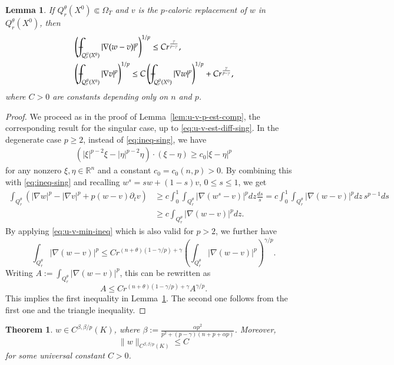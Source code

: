 \documentclass[11pt,oneside,english]{amsart}
\newcommand{\R}{{\mathbb R}}
\newcommand{\al}{\alpha}
\newcommand{\be}{\beta}
\newcommand{\D}{\nabla}
\numberwithin{equation}{section}
\def\Xint#1{\mathchoice
  {\XXint\displaystyle\textstyle{#1}}%
  {\XXint\textstyle\scriptstyle{#1}}%
  {\XXint\scriptstyle\scriptscriptstyle{#1}}%
  {\XXint\scriptscriptstyle\scriptscriptstyle{#1}}%
  \!\int}
\def\XXint#1#2#3{{\setbox0=\hbox{$#1{#2#3}{\int}$}
    \vcenter{\hbox{$#2#3$}}\kern-.5\wd0}}
\def\dashint{\Xint-}
\newtheorem{theorem}{Theorem}
\theoremstyle{plain}
\newtheorem{lemma}{Lemma}
\numberwithin{equation}{section}
\begin{document}
\begin{lemma}
    \label{lem:u-v-p-est-comp-deg}
    If $Q_r^\theta(X^0)\Subset\Omega_T$ and $v$ is the $p$-caloric replacement of $w$ in $Q_r^\theta(X^0)$, then
    \begin{align}
    &\left(\dashint_{Q_r^\theta(X^0)}|\D(w-v)|^p\right)^{1/p}\le Cr^{\frac{\gamma}{p-\gamma}}, \label{eq:u-v-est-0-deg}\\
    &\left(\dashint_{Q_r^\theta(X^0)}|\D v|^p\right)^{1/p}\le C\left(\dashint_{Q_r^\theta(X^0)}|\D w|^p\right)^{1/p}+Cr^{\frac\gamma{p-\gamma}},\label{eq:v-est-0-deg}
    \end{align}
    where $C>0$ are constants depending only on $n$ and $p$.
\end{lemma}

\begin{proof}
We proceed as in the proof of Lemma~\ref{lem:u-v-p-est-comp}, the corresponding result for the singular case, up to \eqref{eq:u-v-est-diff-sing}. In the degenerate case $p\ge2$, instead of \eqref{eq:ineq-sing}, we have
\begin{align*}
    \left(|\xi|^{p-2}\xi-|\eta|^{p-2}\eta\right)\cdot(\xi-\eta)\ge c_0|\xi-\eta|^p
\end{align*}
for any nonzero $\xi,\eta\in\R^n$ and a constant $c_0=c_0(n,p)>0$. By combining this with \eqref{eq:ineq-sing} and recalling $w^s=sw+(1-s)v$, $0\le s\le 1$, we get
\begin{align*}
    \int_{Q_r^\theta}\left(|\D w|^p-|\D v|^p+p(w-v)\partial_tv\right)&\ge c\int_0^1\int_{Q_r^\theta}|\D(w^s-v)|^pdz\frac{ds}s=c\int_0^1\int_{Q_r^\theta}|\D(w-v)|^pdz\,s^{p-1}ds\\
    &\ge c\int_{Q_r^\theta}|\D(w-v)|^pdz.
\end{align*}
By applying \eqref{eq:u-v-min-ineq} which is also valid for $p>2$, we further have
$$
\int_{Q_r^\theta}|\D(w-v)|^p\le Cr^{(n+\theta)(1-\gamma/p)+\gamma}\left(\int_{Q_r^\theta}|\D(w-v)|^p\right)^{\gamma/p}.
$$
Writing $A:=\int_{Q_r^\theta}|\D(w-v)|^p$, this can be rewritten as
$$
A\le Cr^{(n+\theta)(1-\gamma/p)+\gamma}A^{\gamma/p}.
$$
This implies the first inequality in Lemma~\ref{lem:u-v-p-est-comp-deg}. The second one follows from the first one and the triangle inequality.
\end{proof}



\begin{theorem}\label{thm:par-holder-deg}
 $w\in C^{\be,\be/p}(K)$, where $\be:=\frac{\al p^2}{p^2+(p-\gamma)(n+p+\al p) }$. Moreover, 
 $$
 \|w\|_{C^{\be,\be/p}(K)}\le C $$
 for some universal constant $C>0$.
\end{theorem}
\end{document}
